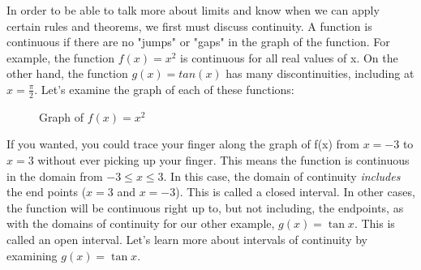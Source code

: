 In order to be able to talk more about limits and know when we can apply certain 
rules and theorems, we first must discuss continuity. A function is continuous if 
there are no "jumps" or "gaps" in the graph of the function. For example, the 
function $f(x) = x^2$ is continuous for all real values of x. On the other hand, 
the function $g(x) = tan(x)$ has many discontinuities, including at $x=\frac{\pi}
{2}$. Let's examine the graph of each of these functions:


\begin{figure}[htbp]
\centering
{}
\caption{Graph of $f(x)=x^2$}
\end{figure}
If you wanted, you could trace your finger along the graph of f(x) from $x=-3$ to 
$x=3$ without ever picking up your finger. This means the function is continuous in 
the domain from $-3 \leq x \leq 3$. In this case, the domain of continuity 
\textit{includes} the end points ($x=3$ and $x=-3$). This is called a closed 
interval. In other cases, the function will be continuous right up to, but not 
including, the endpoints, as with the domains of continuity for our other example, 
$g(x) = \tan{x}$. This is called an open interval. Let's learn more about intervals 
of continuity by examining $g(x) = \tan{x}$.

